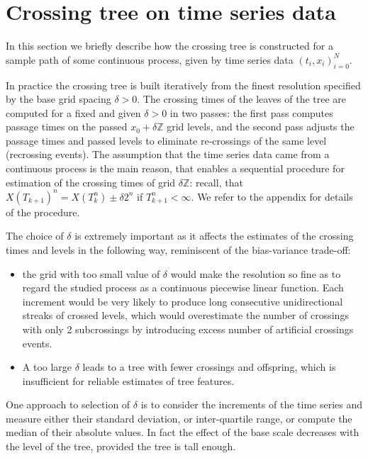 
\section{Crossing tree on time series data} %
\label{sec:crossing_tree_on_time_series_data}

In this section we briefly describe how the crossing tree is constructed for a sample
path of some continuous process, given by time series data $(t_i, x_i)_{i=0}^N$.

In practice the crossing tree is built iteratively from the finest resolution
specified by the base grid spacing $\delta > 0$. The crossing times of the leaves
of the tree are computed for a fixed and given $\delta>0$ in two passes: the first
pass computes passage times on the passed $x_0+\delta \mathbb{Z}$ grid levels, and
the second pass adjusts the passage times and passed levels to eliminate re-crossings
of the same level (recrossing events). The assumption that the time series data
came from a continuous process is the main reason, that enables a sequential procedure
for estimation of the crossing times of grid $\delta\mathbb{Z}$: recall, that
$X(T_{k+1})^n = X(T_k^n) \pm\delta2^n$ if $T_{k+1}^n<\infty$. We refer to the
appendix for details of the procedure.

The choice of $\delta$ is extremely important as it affects the estimates of the
crossing times and levels in the following way, reminiscent of the bias-variance
trade-off:
\begin{itemize}
    \item the grid with too small value of $\delta$ would make the resolution so
    fine as to regard the studied process as a continuous piecewise linear function.
    Each increment would be very likely to produce long consecutive unidirectional
    streaks of crossed levels, which would overestimate the number of crossings
    with only 2 subcrossings by introducing excess number of artificial crossings
    events.
    \item A too large $\delta$ leads to a tree with fewer crossings and offspring,
    which is insufficient for reliable estimates of tree features.
\end{itemize}
One approach to selection of $\delta$ is to consider the increments of the time
series and measure either their standard deviation, or inter-quartile range, or
compute the median of their absolute values. In fact the effect of the base scale
decreases with the level of the tree, provided the tree is tall enough.


